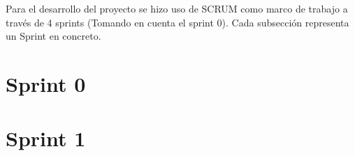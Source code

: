 


Para el desarrollo del proyecto se hizo uso de SCRUM \cite{SCRUM} como marco de trabajo a través de 4 sprints \cite{SCRUM-Sprints} (Tomando en cuenta el sprint 0). Cada subsección representa un Sprint en concreto. 

\section{Sprint 0}

\label{chapter02-section02-sprint0}
\section{Sprint 1}
